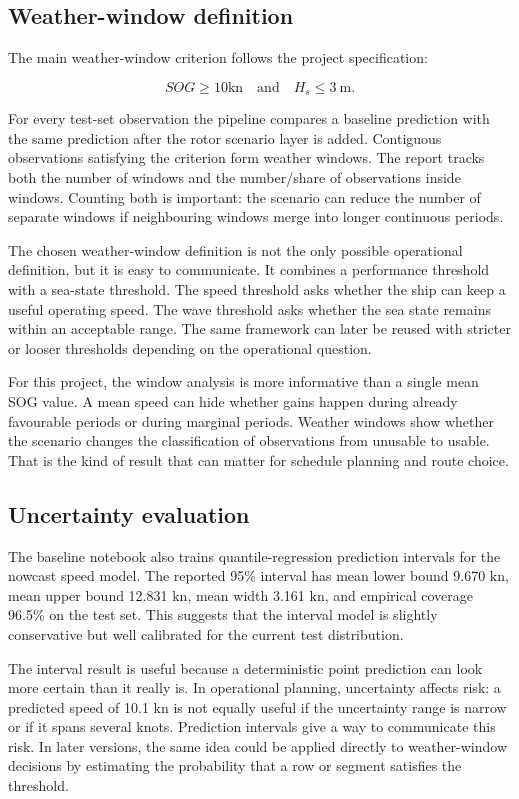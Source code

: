 \documentclass[10pt,a4paper]{article}
\newcommand{\kn}{\ensuremath{\mathrm{kn}}}
\newcommand{\sog}{SOG}
\begin{document}
\subsection{Weather-window definition}

The main weather-window criterion follows the project specification:

\[
\sog \geq 10 \kn \quad \mathrm{and} \quad H_s \leq 3 \mathrm{\ m}.
\]

For every test-set observation the pipeline compares a baseline prediction with
the same prediction after the rotor scenario layer is added. Contiguous
observations satisfying the criterion form weather windows. The report tracks
both the number of windows and the number/share of observations inside windows.
Counting both is important: the scenario can reduce the number of separate
windows if neighbouring windows merge into longer continuous periods.

The chosen weather-window definition is not the only possible operational
definition, but it is easy to communicate. It combines a performance threshold
with a sea-state threshold. The speed threshold asks whether the ship can keep a
useful operating speed. The wave threshold asks whether the sea state remains
within an acceptable range. The same framework can later be reused with stricter
or looser thresholds depending on the operational question.

For this project, the window analysis is more informative than a single mean
\sog{} value. A mean speed can hide whether gains happen during already
favourable periods or during marginal periods. Weather windows show whether the
scenario changes the classification of observations from unusable to usable.
That is the kind of result that can matter for schedule planning and route
choice.

\subsection{Uncertainty evaluation}

The baseline notebook also trains quantile-regression prediction intervals for
the nowcast speed model. The reported 95\% interval has mean lower bound
9.670 \kn{}, mean upper bound 12.831 \kn{}, mean width 3.161 \kn{}, and empirical
coverage 96.5\% on the test set. This suggests that the interval model is
slightly conservative but well calibrated for the current test distribution.

The interval result is useful because a deterministic point prediction can look
more certain than it really is. In operational planning, uncertainty affects
risk: a predicted speed of 10.1 \kn{} is not equally useful if the uncertainty
range is narrow or if it spans several knots. Prediction intervals give a way to
communicate this risk. In later versions, the same idea could be applied
directly to weather-window decisions by estimating the probability that a row or
segment satisfies the threshold.
\end{document}
